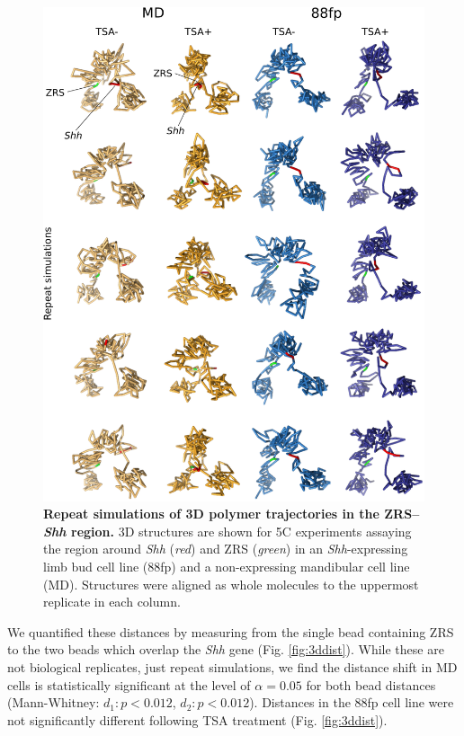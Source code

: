 \documentclass[a4paper,11pt,oneside]{book}
\begin{document}
\begin{figure}
\begin{center} 
\includegraphics[width=5.45in]{figs/3dreps.pdf}
\captionsetup{width=\textwidth} 
\caption[ Repeat simulations of 3D polymer trajectories in the ZRS--\emph{Shh} region. ]{ {\bf Repeat simulations of 3D polymer trajectories in the ZRS--\emph{Shh} region. }
3D structures are shown for 5C experiments assaying the region around \emph{Shh} (\emph{red}) and ZRS (\emph{green}) in an \emph{Shh}-expressing limb bud cell line (88fp) and a non-expressing mandibular cell line (MD). Structures were aligned as whole molecules to the uppermost replicate in each column.
}\label{fig:3dreps}
\end{center} 
\end{figure} 

We quantified these distances by measuring from the single bead containing ZRS to the two beads which overlap the \emph{Shh} gene (Fig. \ref{fig:3ddist}). While these are not biological replicates, just repeat simulations, we find the distance shift in MD cells is statistically significant at the level of $\alpha = 0.05$ for both bead distances (Mann-Whitney: $d_1: p < 0.012$, $d_2: p < 0.012 $). Distances in the 88fp cell line were not significantly different following TSA treatment (Fig. \ref{fig:3ddist}).
\end{document}
